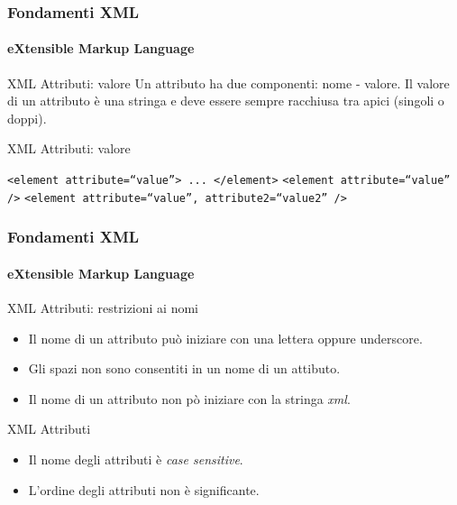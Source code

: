 \begin{frame}
    \frametitle{Fondamenti XML}
    \framesubtitle{eXtensible Markup Language}
    \addtocounter{nframe}{1}

	\begin{block}{XML Attributi: valore}
		Un attributo ha due componenti: nome - valore.
		Il valore di un attributo è una stringa e deve essere sempre racchiusa tra apici (singoli o doppi).
	\end{block}

	\begin{block}{XML Attributi: valore}
		\begin{center}
			\texttt{<element attribute=``value''> ... </element>}
			\texttt{<element attribute=``value'' />}
			\texttt{<element attribute=``value'', attribute2=``value2'' />}
		\end{center}
	\end{block}

\end{frame}

\begin{frame}
    \frametitle{Fondamenti XML}
    \framesubtitle{eXtensible Markup Language}
    \addtocounter{nframe}{1}

	\begin{block}{XML Attributi: restrizioni ai nomi}
		\begin{itemize}
			\item Il nome di un attributo può iniziare con una lettera oppure underscore.
			\item Gli spazi non sono consentiti in un nome di un attibuto.
			\item Il nome di un attributo non pò iniziare con la stringa \textit{xml}.
		\end{itemize}
	\end{block}

	\begin{block}{XML Attributi}
		\begin{itemize}
			\item Il nome degli attributi è \textit{case sensitive}.
			\item L'ordine degli attributi non è significante.
		\end{itemize}
	\end{block}

\end{frame}







